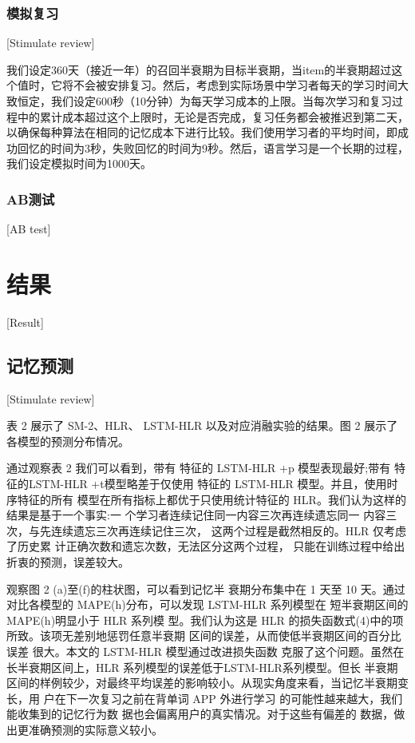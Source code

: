 \subsection{模拟复习}[Stimulate review]

我们设定360天（接近一年）的召回半衰期为目标半衰期，当item的半衰期超过这个值时，它将不会被安排复习。然后，考虑到实际场景中学习者每天的学习时间大致恒定，我们设定600秒（10分钟）为每天学习成本的上限。当每次学习和复习过程中的累计成本超过这个上限时，无论是否完成，复习任务都会被推迟到第二天，以确保每种算法在相同的记忆成本下进行比较。我们使用学习者的平均时间，即成功回忆的时间为3秒，失败回忆的时间为9秒。然后，语言学习是一个长期的过程，我们设定模拟时间为1000天。

\subsection{AB测试}[AB test]

\chapter{结果}[Result]

\section{记忆预测}[Stimulate review]

表 2 展示了 SM-2、HLR、 LSTM-HLR 以及对应消融实验的结果。图 2 展示了各模型的预测分布情况。

通过观察表 2 我们可以看到，带有 特征的 LSTM-HLR +p 模型表现最好;带有 特 征的LSTM-HLR +t模型略差于仅使用 特征的 LSTM-HLR 模型。并且，使用时序特征的所有 模型在所有指标上都优于只使用统计特征的 HLR。我们认为这样的结果是基于一个事实:一 个学习者连续记住同一内容三次再连续遗忘同一 内容三次，与先连续遗忘三次再连续记住三次， 这两个过程是截然相反的。HLR 仅考虑了历史累 计正确次数和遗忘次数，无法区分这两个过程， 只能在训练过程中给出折衷的预测，误差较大。

观察图 2 (a)至(f)的柱状图，可以看到记忆半 衰期分布集中在 1 天至 10 天。通过对比各模型的 MAPE(h)分布，可以发现 LSTM-HLR 系列模型在 短半衰期区间的 MAPE(h)明显小于 HLR 系列模 型。我们认为这是 HLR 的损失函数式(4)中的项所致。该项无差别地惩罚任意半衰期 区间的误差，从而使低半衰期区间的百分比误差 很大。本文的 LSTM-HLR 模型通过改进损失函数 克服了这个问题。虽然在长半衰期区间上，HLR 系列模型的误差低于LSTM-HLR系列模型。但长 半衰期区间的样例较少，对最终平均误差的影响较小。从现实角度来看，当记忆半衰期变长，用 户在下一次复习之前在背单词 APP 外进行学习 的可能性越来越大，我们能收集到的记忆行为数 据也会偏离用户的真实情况。对于这些有偏差的 数据，做出更准确预测的实际意义较小。

